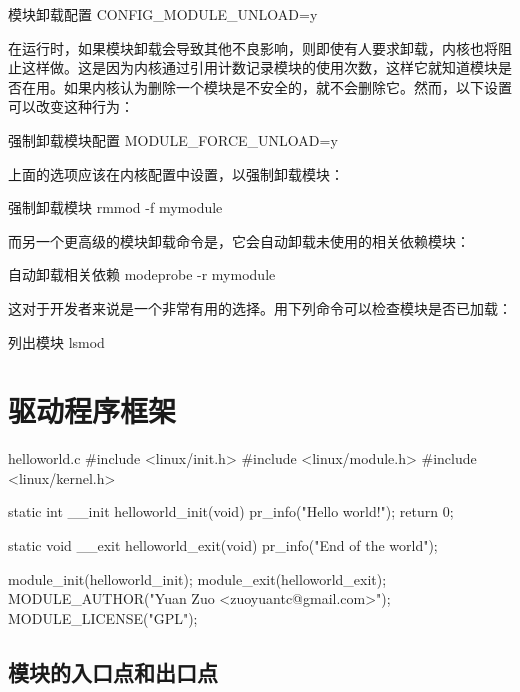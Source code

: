 \documentclass[lang=cn,newtx,10pt,scheme=chinese]{elegantbook}
\begin{document}
\begin{enumerate}
    \begin{mycode}{模块卸载配置}
        CONFIG_MODULE_UNLOAD=y
    \end{mycode}

    在运行时，如果模块卸载会导致其他不良影响，则即使有人要求卸载，内核也将阻止这样做。这是因为内核通过引用计数记录模块的使用次数，这样它就知道模块是否在用。如果内核认为删除一个模块是不安全的，就不会删除它。然而，以下设置可以改变这种行为：

    \begin{mycode}{强制卸载模块配置}
        MODULE_FORCE_UNLOAD=y
    \end{mycode}

    上面的选项应该在内核配置中设置，以强制卸载模块：

    \begin{mycode}{强制卸载模块}
        rmmod -f mymodule
    \end{mycode}

    而另一个更高级的模块卸载命令是，它会自动卸载未使用的相关依赖模块：

    \begin{mycode}{自动卸载相关依赖}
        modeprobe -r mymodule
    \end{mycode}

    这对于开发者来说是一个非常有用的选择。用下列命令可以检查模块是否已加载：

    \begin{mycode}{列出模块}
        lsmod
    \end{mycode}
\end{enumerate}

\section{驱动程序框架}

\begin{mycode}{helloworld.c}
#include <linux/init.h>
#include <linux/module.h>
#include <linux/kernel.h>

static int __init helloworld_init(void) {
    pr_info("Hello world!\n");
    return 0;
}

static void __exit helloworld_exit(void) {
    pr_info("End of the world\n");
}

module_init(helloworld_init);
module_exit(helloworld_exit);
MODULE_AUTHOR("Yuan Zuo <zuoyuantc@gmail.com>");
MODULE_LICENSE("GPL");
\end{mycode}

\subsection{模块的入口点和出口点}
\end{document}
